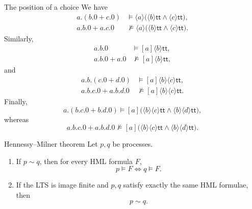 \documentclass[a4paper]{article}
\newcommand{\ttt}{\mathsf{tt}}
\begin{document}
\begin{snippetexample}{The position of a choice}
    We have
    \begin{align*}
        a.(b.0+c.0)
        &\models
        \langle a\rangle
        \bigl(\langle b\rangle\ttt\land\langle c\rangle\ttt\bigr),\\
        a.b.0+a.c.0
        &\not\models
        \langle a\rangle
        \bigl(\langle b\rangle\ttt\land\langle c\rangle\ttt\bigr).
    \end{align*}
    Similarly,
    \begin{align*}
        a.b.0 &\models [a]\langle b\rangle\ttt,\\
        a.b.0+a.0 &\not\models [a]\langle b\rangle\ttt,
    \end{align*}
    and
    \begin{align*}
        a.b.(c.0+d.0)
        &\models [a]\langle b\rangle\langle c\rangle\ttt,\\
        a.b.c.0+a.b.d.0
        &\not\models [a]\langle b\rangle\langle c\rangle\ttt.
    \end{align*}
    Finally,
    \[
        a.(b.c.0+b.d.0)
        \models
        [a]\bigl(
            \langle b\rangle\langle c\rangle\ttt
            \land
            \langle b\rangle\langle d\rangle\ttt
        \bigr),
    \]
    whereas
    \[
        a.b.c.0+a.b.d.0
        \not\models
        [a]\bigl(
            \langle b\rangle\langle c\rangle\ttt
            \land
            \langle b\rangle\langle d\rangle\ttt
        \bigr).
    \]
\end{snippetexample}

\begin{snippettheorem}{Hennessy--Milner theorem}
    Let \(p,q\) be processes.
    \begin{enumerate}
        \item If \(p\sim q\), then for every HML formula \(F\),
            \[
                p\models F
                \iff
                q\models F.
            \]
        \item If the LTS is image finite and \(p,q\) satisfy exactly the same HML formulae, then
            \[
                p\sim q.
            \]
    \end{enumerate}
\end{snippettheorem}
\end{document}
